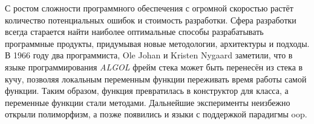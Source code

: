 
С ростом сложности программного обеспечения с огромной скоростью растёт количество потенциальных ошибок и стоимость разработки. Сфера разработки всегда старается найти наиболее оптимальные способы разрабатывать программные продукты, придумывая новые методологии, архитектуры и подходы. В 1966 году два программиста, Ole Johan и Kristen Nygaard заметили, что в языке программирования \textit{ALGOL} фрейм стека может быть перенесён из стека в кучу, позволяя локальным переменным функции переживать время работы самой функции. Таким образом, функция превратилась в конструктор для класса, а переменные функции стали методами. Дальнейшие эксперименты неизбежно открыли полиморфизм, а позже появились и языки с поддержкой парадигмы \gls{oop}.